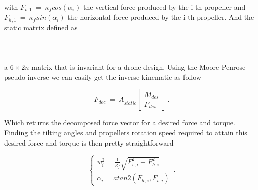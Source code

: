 with $F_{v,1}\ = \ \kappa_f cos(\alpha_i)$ the vertical force produced by the i-th
propeller and $F_{h,1}\ = \ \kappa_f sin(\alpha_i)$ the horizontal force produced
by the i-th propeller. And the static matrix defined as\\\\
\\\\
a $6 \times 2n$ matrix that is invariant for a drone design. Using the Moore-Penrose
pseudo inverse we can easily get the inverse kinematic as follow

\begin{equation}
  \label{inverse_kin}
  F_{dec}  \ = \ A_{static}^{\dagger}
    \begin{bmatrix}
      M_{des} \\
      F_{des}
    \end{bmatrix}
    \, .
\end{equation}

Which returns the decomposed force vector for a desired force and torque. Finding
the tilting angles and propellers rotation speed required to attain this desired
force and torque is then pretty straightforward

\begin{equation}
  \label{decomposition}
  \begin{cases}
    w_i^2 = \frac{1}{\kappa_f} \sqrt{F_{v,i}^2 + F_{h,i}^2} \\
    \alpha_i = atan2(F_{h,i},F_{v,i})
  \end{cases}\, .
\end{equation}


